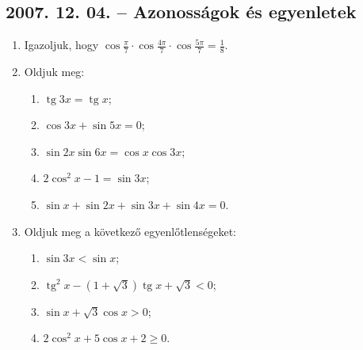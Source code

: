 \documentclass{article}
\newenvironment{abc}{\begin{enumerate}[label=\textit{\alph*})]}{\end{enumerate}}
\newcommand{\tg}{\mathop{\mathrm{tg}}\nolimits}
\begin{document}
\subsection*{2007. 12. 04. -- Azonosságok és egyenletek}
\begin{enumerate}
\item Igazoljuk, hogy $\cos\displaystyle{\frac{\pi}{7}}\cdot\cos\displaystyle{\frac{4\pi}{7}}\cdot\cos\displaystyle{\frac{5\pi}{7}}=\displaystyle{\frac{1}{8}}$.
\item Oldjuk meg:
\begin{abc}
\item $\tg3x=\tg x$;
\item $\cos3x+\sin5x=0$;
\item $\sin2x\sin6x=\cos x\cos3x$;
\item $2\cos^2x-1=\sin3x$;
\item $\sin x+\sin2x+\sin3x+\sin4x=0$.
\end{abc}
\item Oldjuk meg a következő egyenlőtlenségeket:
\begin{abc}
\item $\sin3x<\sin x$;
\item $\tg^2x-\left(1+\sqrt3\right)\tg x+\sqrt3<0$;
\item $\sin x+\sqrt3\cos x>0$;
\item $2\cos^2x+5\cos x+2\ge0$.
\end{abc}
\end{enumerate}
\end{document}
